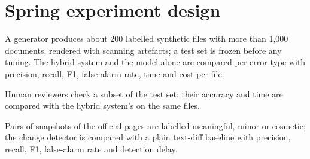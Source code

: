 \section{Spring experiment design}
\begin{description}[style=nextline,leftmargin=1.2cm]
  \item[AS1] A generator produces about 200 labelled synthetic files with more than 1,000
    documents, rendered with scanning artefacts; a test set is frozen before any tuning. The
    hybrid system and the model alone are compared per error type with precision, recall, F1,
    false-alarm rate, time and cost per file.
  \item[AS2] Human reviewers check a subset of the test set; their accuracy and time are compared
    with the hybrid system's on the same files.
  \item[AS3] Pairs of snapshots of the official pages are labelled meaningful, minor or cosmetic;
    the change detector is compared with a plain text-diff baseline with precision, recall, F1,
    false-alarm rate and detection delay.
\end{description}
